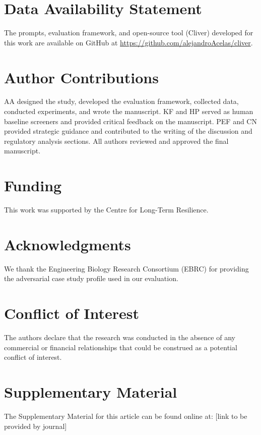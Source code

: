 \documentclass[utf8]{FrontiersinHarvard}
\begin{document}
\section*{Data Availability Statement}

The prompts, evaluation framework, and open-source tool (Cliver) developed for this work are available on GitHub at \url{https://github.com/alejandroAcelas/cliver}.

\section*{Author Contributions}

AA designed the study, developed the evaluation framework, collected data, conducted experiments, and wrote the manuscript. KF and HP served as human baseline screeners and provided critical feedback on the manuscript. PEF and CN provided strategic guidance and contributed to the writing of the discussion and regulatory analysis sections. All authors reviewed and approved the final manuscript.

\section*{Funding}

This work was supported by the Centre for Long-Term Resilience.

\section*{Acknowledgments}

We thank the Engineering Biology Research Consortium (EBRC) for providing the adversarial case study profile used in our evaluation.

\section*{Conflict of Interest}

The authors declare that the research was conducted in the absence of any commercial or financial relationships that could be construed as a potential conflict of interest.

\section*{Supplementary Material}

The Supplementary Material for this article can be found online at: [link to be provided by journal]



\end{document}
